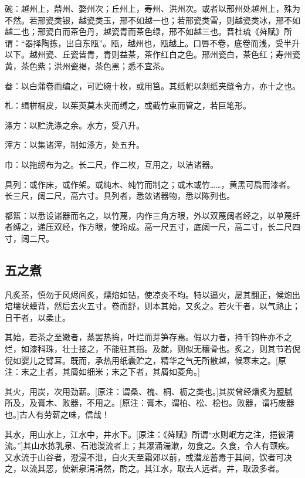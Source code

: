 \documentclass[]{article}
\begin{document}
碗：越州上，鼎州、婺州次；丘州上，寿州、洪州次。或者以邢州处越州上，殊为不然。若邢瓷类银，越瓷类玉，邢不如越一也；若邢瓷类雪，则越瓷类冰，邢不如越二也；邢瓷白而茶色丹，越瓷青而茶色绿，邢不如越三也。晋杜琉《荈赋》所谓：``器择陶拣，出自东瓯''。瓯，越州也，瓯越上。口唇不卷，底卷而浅，受半升以下。越州瓷、丘瓷皆青，青则益茶，茶作红白之色。邢州瓷白，茶色红；寿州瓷黄，茶色紫；洪州瓷褐，茶色黑；悉不宜茶。

畚：以白蒲卷而编之，可贮碗十枚，或用筥。其纸帊以剡纸夹缝令方，亦十之也。

札：缉栟榈皮，以茱萸莫木夹而缚之，或截竹束而管之，若巨笔形。

涤方：以贮洗涤之余。水方，受八升。

滓方：以集诸滓，制如涤方，处五升。

巾：以拖縍布为之。长二尺，作二枚，互用之，以洁诸器。

具列：或作床，或作架。或纯木、纯竹而制之；或木或竹\ldots{}\ldots{}，黄黑可扃而漆者。长三尺，阔二尺，高六寸。具列者，悉敛诸器物，悉以陈列也。

都篮：以悉设诸器而名之，以竹蔑，内作三角方眼，外以双蔑阔者经之，以单蔑纤者缚之，递压双经，作方眼，使玲成。高一尺五寸，底阔一尺，高二寸，长二尺四寸，阔二尺。

\hypertarget{header-n26}{%
\subsection{五之煮}\label{header-n26}}

凡炙茶，慎勿于风烬间炙，熛焰如钻，使凉炎不均。特以逼火，屡其翻正，候炮出培塿状蟆背，然后去火五寸。卷而舒，则本其始，又炙之。若火干者，以气熟止；日干者，以柔止。

其始，若茶之至嫩者，蒸罢热捣，叶烂而芽笋存焉。假以力者，持千钧杵亦不之烂，如漆科珠，壮士接之，不能驻其指。及就，则似无穰骨也。炙之，则其节若倪倪如婴儿之臂耳。既而，承热用纸囊贮之，精华之气无所散越，候寒末之。{[}原注：末之上者，其屑如细米；末之下者，其屑如菱角。{]}

其火，用炭，次用劲薪。{[}原注：谓桑、槐、桐、枥之类也。{]}其炭曾经燔炙为膻腻所及，及膏木、败器，不用之。{[}原注：膏木，谓柏、松、桧也。败器，谓朽废器也。{]}古人有劳薪之味，信哉！

其水，用山水上，江水中，井水下。{[}原注：《荈赋》所谓``水则岷方之注，挹彼清流。''{]}其山水拣乳泉、石池漫流者上；其瀑涌湍漱，勿食之。久食，令人有颈疾。又水流于山谷者，澄浸不泄，自火天至霜郊以前，或潜龙蓄毒于其间，饮者可决之，以流其恶，使新泉涓涓然，酌之。其江水，取去人远者。井，取汲多者。
\end{document}
